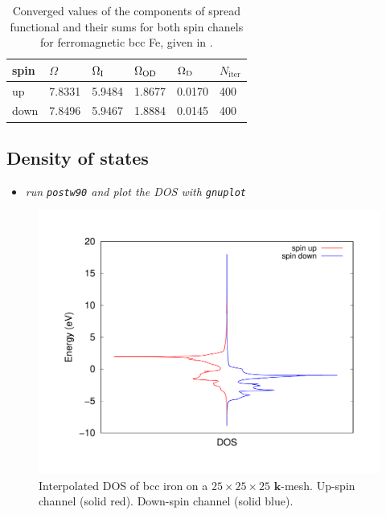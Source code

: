\begin{table}[t!]
	\centering
	\captionsetup{width=.5\textwidth}
	\caption{Converged values of the components of spread functional and their sums for both spin chanels for ferromagnetic bcc Fe, given in \angsqd{}.}
	\begin{tabular}{@{} llllll @{}}\toprule[1.5pt]
	spin & $\Omega$ & $\Omega\tinysub{I}$ & $\Omega\tinysub{OD}$ & $\Omega\tinysub{D}$ & $N_{\mathrm{iter}}$ \\\midrule
	up & 7.8331 & 5.9484 & 1.8677 & 0.0170 & 400 \\
	down & 7.8496 & 5.9467 & 1.8884 & 0.0145 & 400 \\\bottomrule[1pt]
	\end{tabular}\label{tab8.1}
\end{table}


\subsection*{Density of states}
\begin{itemize}
	\item {\it run {\tt postw90} and plot the DOS with {\tt gnuplot}}
\end{itemize}
	\begin{figure}[h!]
	\centering
	\includegraphics[width=0.7\columnwidth]{figure/example08/DOS_iron_bcc.pdf}
	\caption{Interpolated DOS of bcc iron on a $25\times25\times25$ $\mathbf{k}$-mesh. Up-spin channel (solid red). Down-spin channel (solid blue).}\label{fig8.1}
	\end{figure}
